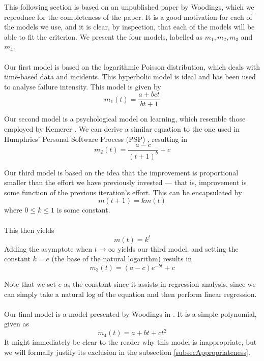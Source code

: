 This following section is based on an unpublished paper by Woodings, which we
reproduce for the completeness of the paper.
It is a good motivation for each of the models we use, and it is clear, by
inspection, that each of the models will be able to fit the criterion.
We present the four models, labelled as $m_1, m_2, m_3$ and $m_4$.\\
\\
Our first model is based on the logarithmic Poisson distribution, which
deals with time-based data and incidents.
This hyperbolic model is ideal and has been used to analyse failure intensity.
This model is given by
\begin{equation} \label{modelOne}
  m_1(t) = \frac{a+bct}{bt+1}
\end{equation}

Our second model is a psychological model on learning, which resemble those employed by Kemerer
\cite{kemerer1992now}.
We can derive a similar equation to the one used in Humphries' Personal Software
Process (PSP) \cite{humphrey1997introduction}, resulting in
\begin{equation} \label{modelTwo}
  m_2(t) = \frac{a-c}{(t+1)^{b}}+c
\end{equation}

Our third model is based on the idea that the improvement is proportional
smaller than
the effort we have previously invested --- that is, improvement is some function of the
previous iteration's effort.
This can be encapsulated by 
\[
  m(t+1) = k m(t)
\]
where $0 \leq k \leq 1$ is some constant.\\
\\
This then yields
\[
  m(t) = k^t 
\]
Adding the asymptote when $t \to \infty$ yields our third model, and setting the
constant $k = e$ (the base of the natural logarithm) results in
\begin{equation} \label{modelThree}
  m_3(t) = (a-c) e^{-bt} + c
\end{equation}

Note that we set $e$ as the constant since it assists in regression analysis,
since we can simply take a natural log of the equation and then perform linear
regression.\\
\\
Our final model is a model presented by Woodings in \cite{WoodingsUnpublished}.
It is a simple polynomial, given as
\begin{equation} \label{modelFour}
  m_4(t) = a + bt + ct^2
\end{equation}
It might immediately be clear to the reader why this model is inappropriate, but
we will formally justify its exclusion in the subsection \ref{subsecAppropriateness}.

